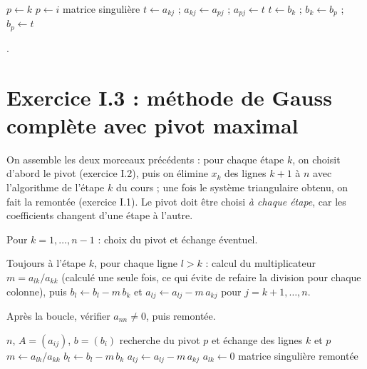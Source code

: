 \begin{algo}
  \State $p \leftarrow k$
     \State $p \leftarrow i$ \EndIf
  \EndFor
   \Print \og matrice singulière \fg{} \Stop \EndIf
      \State $t \leftarrow a_{kj}$ ; $a_{kj} \leftarrow a_{pj}$ ; $a_{pj} \leftarrow t$
    \EndFor
    \State $t \leftarrow b_k$ ; $b_k \leftarrow b_p$ ; $b_p \leftarrow t$
  \EndIf
\end{algo}

\Refs {}.

\section{Exercice I.3 : méthode de Gauss complète avec pivot maximal}


\Pourquoi On assemble les deux morceaux précédents : pour chaque étape $k$, on
choisit d'abord le pivot (exercice I.2), puis on élimine $x_k$ des lignes
$k+1$ à $n$ avec l'algorithme de l'étape $k$ du cours ; une fois le système
triangulaire obtenu, on fait la remontée (exercice I.1). Le pivot doit être
choisi \emph{à chaque étape}, car les coefficients changent d'une étape à
l'autre.

\Etapes
{} Pour $k = 1, \dots, n-1$ : choix du pivot et échange éventuel.

 Toujours à l'étape $k$, pour chaque ligne $l > k$ : calcul du
multiplicateur $m = a_{lk}/a_{kk}$ (calculé une seule fois, ce qui évite de
refaire la division pour chaque colonne), puis $b_l \leftarrow b_l - m\,b_k$ et
$a_{lj} \leftarrow a_{lj} - m\,a_{kj}$ pour $j = k+1, \dots, n$.

 Après la boucle, vérifier $a_{nn} \neq 0$, puis remontée.

\begin{algo}
  \Require $n$, $A = (a_{ij})$, $b = (b_i)$
    \State recherche du pivot $p$ et échange des lignes $k$ et $p$ 
      \State $m \leftarrow a_{lk}/a_{kk}$
      \State $b_l \leftarrow b_l - m\,b_k$
        \State $a_{lj} \leftarrow a_{lj} - m\,a_{kj}$
      \EndFor
      \State $a_{lk} \leftarrow 0$
    \EndFor
  \EndFor
   \Print \og matrice singulière \fg{} \Stop \EndIf
  \State remontée 
\end{algo}

